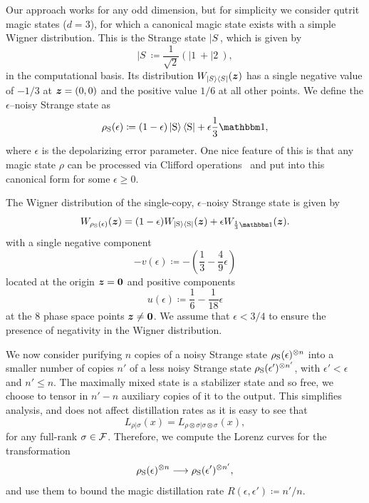 \documentclass[pra,
aps,
twocolumn,
superscriptaddress,
groupedaddress,
nofootinbib,
reprint
]{revtex4-1}
\begin{document}
Our approach works for any odd dimension, but for simplicity we consider qutrit magic states ($d=3$), for which a canonical magic state exists with a simple Wigner distribution. This is the Strange state $|S\>$, which is given by
\begin{equation}
|S\> \coloneqq \frac{1}{\sqrt{2}} (|1\> + |2\>),
\end{equation}
in the computational basis. Its distribution $W_{|S\rangle\langle S|}(\boldsymbol{z})$ has a single negative value of $-1/3$ at $\bm{z} =(0,0)$ and the positive value $1/6$ at all other points. We define the $\epsilon$--noisy Strange state as
\begin{equation}\label{eq:noisysn}
    \rho_{\rm{S}}(\epsilon)\coloneqq (1 - \epsilon) \ket{\rm{S}}\bra{\rm{S}} + \epsilon \frac{1}{3}\id,
\end{equation}
where $\epsilon$ is the depolarizing error parameter. One nice feature of this is that any magic state $\rho$ can be processed via Clifford operations~\cite{cit:prakash,cit:prakash2} and put into this canonical form for some $\epsilon \ge 0$.

The Wigner distribution of the single-copy, $\epsilon$--noisy Strange state  is given by
\begin{equation}
	\W[\bmz]{\rho_{\rm{S}}(\epsilon)} = (1-\epsilon)\W[\bmz]{|\rm{S}\>\<\rm{S}|} + \epsilon\W[\bmz]{\frac{1}{3}\id}.
\end{equation}
with a single negative component
\begin{equation}
	- v(\epsilon) \coloneqq - \left( \frac{1}{3} -\frac{4}{9}\epsilon \right)
\end{equation} 
located at the origin $\bm{z} = \bm{0}$ and positive components
\begin{equation}
	u(\epsilon) \coloneqq \frac{1}{6} -\frac{1}{18}\epsilon
\end{equation}
at the 8 phase space points $\bm{z} \ne \mathbf{0}$. We assume that $\epsilon < 3/4$ to ensure the presence of negativity in the Wigner distribution. 

We now consider purifying $n$ copies of a noisy Strange state $\rho_{\rm{S}}(\epsilon)^{\otimes n}$ into a smaller number of copies $n'$ of a less noisy Strange state $\rho_{\rm{S}}(\epsilon')^{\otimes n'}$, with $\epsilon' < \epsilon$ and $n' \leq n$. The maximally mixed state is a stabilizer state and so free, we choose to tensor in $n'-n$ auxiliary copies of it to the output. This simplifies analysis, and does not affect distillation rates as it is easy to see that
\begin{equation}
	L_{\rho |\sigma} (x) = L_{\rho \otimes \sigma |\sigma \otimes \sigma}(x),
\end{equation}
for any full-rank $\sigma \in {\mathcal F}$. Therefore, we compute the Lorenz curves for the transformation
\begin{equation}\label{eq:sudist}
	\rho_{\rm{S}}(\epsilon)^{\otimes n} \longrightarrow \rho_{\rm{S}}(\epsilon')^{\otimes n'}, %
\end{equation}
and use them to bound the magic distillation rate $R(\epsilon, \epsilon') \coloneqq n'/n$.
\end{document}
